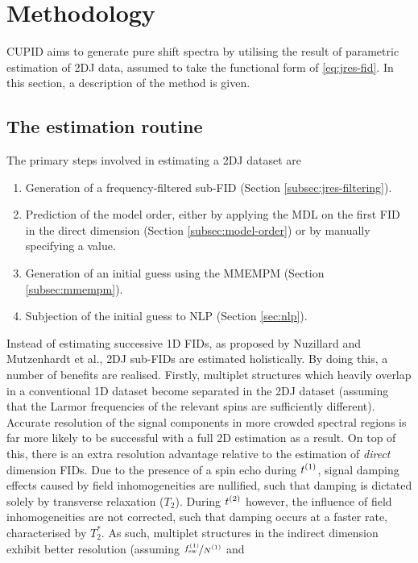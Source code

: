 \section{Methodology}
\ac{CUPID} aims to generate pure shift spectra by utilising the result of
parametric estimation of \ac{2DJ} data, assumed to take the functional form of
\eqref{eq:jres-fid}. In this section, a description of the method is given.

\subsection{The estimation routine}
The primary steps involved in estimating a \ac{2DJ} dataset are
\begin{enumerate}
    \item Generation of a frequency-filtered sub-\ac{FID} (Section
        \ref{subsec:jres-filtering}).
    \item Prediction of the model order, either by applying the \ac{MDL} on the
        first \ac{FID} in the direct dimension (Section
        \ref{subsec:model-order}) or by manually specifying a
        value.
    \item Generation of an initial guess using the \ac{MMEMPM} (Section
        \ref{subsec:mmempm}).
    \item Subjection of the initial guess to \ac{NLP} (Section \ref{sec:nlp}).
\end{enumerate}
Instead of estimating successive \ac{1D} \acp{FID}, as proposed by
Nuzillard and Mutzenhardt et al., \ac{2DJ} sub-\acp{FID} are estimated
holistically. By doing this, a number of benefits are realised.
Firstly, multiplet structures which heavily overlap in a
conventional \ac{1D} dataset become separated in the \ac{2DJ} dataset (assuming
that the Larmor frequencies of the relevant spins are sufficiently different).
Accurate resolution of the signal components in more crowded spectral
regions is far more likely to be successful with a full \ac{2D} estimation as a
result.
On top of this, there is an extra resolution advantage relative to the
estimation of \emph{direct} dimension \acp{FID}. Due to the presence of a spin
echo during $t^{(1)}$, signal damping effects caused by field inhomogeneities are
nullified, such that damping is dictated solely by transverse relaxation
($T_2$). During $t^{(2)}$ however, the influence of field inhomogeneities are not
corrected, such that damping occurs at a faster rate, characterised by $T_2^*$.
As such, multiplet structures in the indirect dimension exhibit better
resolution (assuming $\nicefrac{\fswone}{\None}$ and
